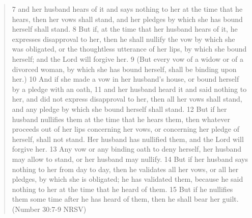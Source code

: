 \documentclass[11pt]{article}
\begin{document}
\begin{quote}
 7 and her husband hears of it and says nothing to her at the time that he hears, then her vows shall stand, and her pledges by which she has bound herself shall stand. 8 But if, at the time that her husband hears of it, he expresses disapproval to her, then he shall nullify the vow by which she was obligated, or the thoughtless utterance of her lips, by which she bound herself; and the Lord will forgive her. 9 (But every vow of a widow or of a divorced woman, by which she has bound herself, shall be binding upon her.) 10 And if she made a vow in her husband’s house, or bound herself by a pledge with an oath, 11 and her husband heard it and said nothing to her, and did not express disapproval to her, then all her vows shall stand, and any pledge by which she bound herself shall stand. 12 But if her husband nullifies them at the time that he hears them, then whatever proceeds out of her lips concerning her vows, or concerning her pledge of herself, shall not stand. Her husband has nullified them, and the Lord will forgive her. 13 Any vow or any binding oath to deny herself, her husband may allow to stand, or her husband may nullify. 14 But if her husband says nothing to her from day to day, then he validates all her vows, or all her pledges, by which she is obligated; he has validated them, because he said nothing to her at the time that he heard of them. 15 But if he nullifies them some time after he has heard of them, then he shall bear her guilt.
 (Number 30:7-9 NRSV)
\end{quote}
\end{document}
